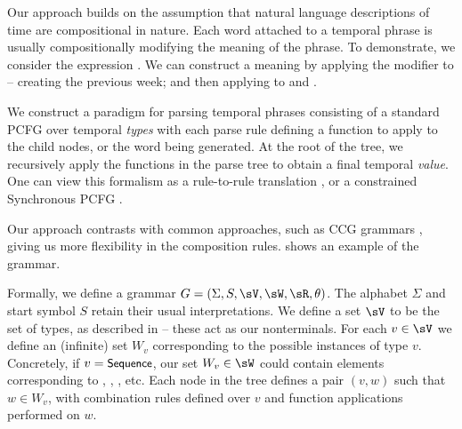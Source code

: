 Our approach builds on the assumption that natural language descriptions
	of time are compositional in nature.
Each word attached to a temporal phrase is 
	usually compositionally modifying the meaning of the phrase.
To demonstrate, we consider the expression .
We can construct a meaning by 
	applying the modifier  to  -- 
	creating the previous week;
	and then applying  to  and .

We construct a paradigm for parsing temporal phrases 
	consisting of a standard PCFG over temporal \textit{types} with each parse 
	rule defining a function to apply to the child nodes, or the word being
	generated.
At the root of the tree, we recursively apply the functions in the parse tree
	to obtain a final temporal \textit{value}.
One can view this formalism as a rule-to-rule translation
	\cite[p.~263]{key:1976bach-semantics,key:1995allen-semantics},
	or a constrained Synchronous PCFG
	\cite{key:2001yamada-syntaxmt}.

Our approach contrasts with common approaches, such as CCG grammars 
	\cite{key:2000steedman-ccg,key:2004bos-ccg,2011kwiatkowski-semantics},
	giving us more flexibility in the composition rules.
 shows an example of the grammar.

Formally, we define a grammar
	$G = \left(\Sigma,S,\sV,\sW,\sR,\theta\right)$.
The alphabet $\Sigma$ and start symbol $S$ retain their usual interpretations.
We define a set $\sV$ to be the set of types, as described in
	 -- these act as our nonterminals.
For each $v \in \sV$ we define an (infinite) set $W_v$ corresponding to the 
	possible instances of type $v$.
Concretely, if $v=\textsf{\small{Sequence}}$, our set $W_v \in \sW$ could contain elements
	corresponding to , , , etc.
Each node in the tree defines a pair $(v,w)$ such that $w \in W_v$,
	with combination rules defined over $v$ and function applications performed
	on $w$.

